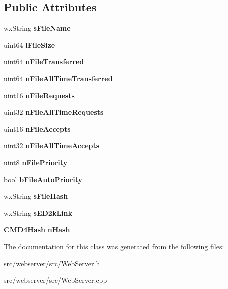 \subsection*{Public Attributes}
\begin{DoxyCompactItemize}
\item 
wxString {\bfseries sFileName}\label{classSharedFile_a09a4dbb7c1cb3e8abc9cc9f9662d0a3c}

\item 
uint64 {\bfseries lFileSize}\label{classSharedFile_a3d1b080e614a5405c9caf8a9e1d7c18a}

\item 
uint64 {\bfseries nFileTransferred}\label{classSharedFile_ac2a1da9c5b0697eda6454b8281c72fa0}

\item 
uint64 {\bfseries nFileAllTimeTransferred}\label{classSharedFile_a3dd2e516d45c9162f40ab6c484f0ecb7}

\item 
uint16 {\bfseries nFileRequests}\label{classSharedFile_a65ee2612628ccede58f431ebd483704a}

\item 
uint32 {\bfseries nFileAllTimeRequests}\label{classSharedFile_ab2e38cdfccb0d6ec418fd4dc64d90e62}

\item 
uint16 {\bfseries nFileAccepts}\label{classSharedFile_a04e4e6ead87b333d6b7e54ae3a225c58}

\item 
uint32 {\bfseries nFileAllTimeAccepts}\label{classSharedFile_a5a8d3027dfd9574f9faeec17bd1b438a}

\item 
uint8 {\bfseries nFilePriority}\label{classSharedFile_acf097602ff1572f797f2bd4e2b4467d0}

\item 
bool {\bfseries bFileAutoPriority}\label{classSharedFile_a98466c81f54196263fe29b9cd16616e6}

\item 
wxString {\bfseries sFileHash}\label{classSharedFile_a5b297404ce34febba64c69ea2b56f824}

\item 
wxString {\bfseries sED2kLink}\label{classSharedFile_a1731aa0ed87dfc6ac240952fabf56670}

\item 
{\bf CMD4Hash} {\bfseries nHash}\label{classSharedFile_afac87c889e6676545f7274072132c891}

\end{DoxyCompactItemize}


The documentation for this class was generated from the following files:\begin{DoxyCompactItemize}
\item 
src/webserver/src/WebServer.h\item 
src/webserver/src/WebServer.cpp\end{DoxyCompactItemize}
